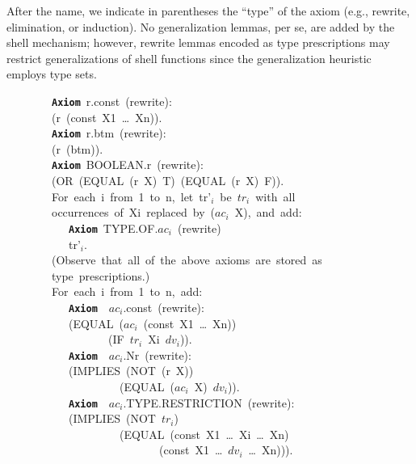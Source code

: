 \documentclass[11pt]{book}
\newenvironment{pubasis}{\begin{flushleft}\ttfamily\small}{\normalsize\rmfamily\end{flushleft}}
\newcommand{\axiomordefinition}[1]{\vspace{6pt}\texttt{\textbf{#1}}}
\begin{document}
After the name, we indicate in parentheses the ``type'' of
the axiom (e.g., rewrite, elimination, or induction).  No generalization lemmas, per se,
are added by the shell mechanism; however, rewrite lemmas encoded as
type prescriptions may restrict generalizations of shell functions
since the generalization heuristic employs type sets.
\begin{pubasis}
~~~~~~~~\axiomordefinition{Axiom}~r.const~(rewrite):\\
~~~~~~~~(r~(const~X1~\ldots{}~Xn)).\\

~~~~~~~~\axiomordefinition{Axiom}~r.btm~(rewrite):\\
~~~~~~~~(r~(btm)).\\

~~~~~~~~\axiomordefinition{Axiom}~BOOLEAN.r~(rewrite):\\
~~~~~~~~(OR~(EQUAL~(r~X)~T)~(EQUAL~(r~X)~F)).\\

~~~~~~~~For~each~i~from~1~to~n,~let~tr'$_{i}$~be~$tr_{i}$~with~all\\
~~~~~~~~occurrences~of~Xi~replaced~by~($ac_{i}$~X),~and~add:\\

~~~~~~~~~~~\axiomordefinition{Axiom}~TYPE.OF.$ac_{i}$~(rewrite)\\
~~~~~~~~~~~tr'$_{i}$.\\

~~~~~~~~(Observe~that~all~of~the~above~axioms~are~stored~as\\
~~~~~~~~type~prescriptions.)\\

~~~~~~~~For~each~i~from~1~to~n,~add:\\

~~~~~~~~~~~\axiomordefinition{Axiom}~~$ac_{i}$.const~(rewrite):\\
~~~~~~~~~~~(EQUAL~($ac_{i}$~(const~X1~\ldots{}~Xn))\\
~~~~~~~~~~~~~~~~~~(IF~$tr_{i}$~Xi~$dv_{i}$)).\\

~~~~~~~~~~~\axiomordefinition{Axiom}~~$ac_{i}$.Nr~(rewrite):\\
~~~~~~~~~~~(IMPLIES~(NOT~(r~X))\\
~~~~~~~~~~~~~~~~~~~~(EQUAL~($ac_{i}$~X)~$dv_{i}$)).\\

~~~~~~~~~~~\axiomordefinition{Axiom}~~$ac_{i}$.TYPE.RESTRICTION~(rewrite):\\
~~~~~~~~~~~(IMPLIES~(NOT~$tr_{i}$)\\
~~~~~~~~~~~~~~~~~~~~(EQUAL~(const~X1~\ldots{}~Xi~\ldots{}~Xn)\\
~~~~~~~~~~~~~~~~~~~~~~~~~~~(const~X1~\ldots{}~$dv_{i}$~\ldots{}~Xn))).\\


\end{pubasis}
\end{document}
